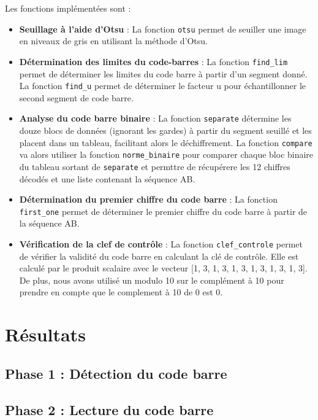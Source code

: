 \documentclass{rapport}
\begin{document}
Les fonctions implémentées sont :
\begin{itemize}
	\item \textbf{Seuillage à l'aide d'Otsu} : La fonction \texttt{otsu} permet de seuiller une image en niveaux de gris en utilisant la méthode d'Otsu.
	\item \textbf{Détermination des limites du code-barres} : La fonction \texttt{find\_lim} permet de déterminer les limites du code barre à partir d'un segment donné. 
	La fonction \texttt{find\_u} permet de déterminer le facteur u pour échantillonner le second segment de code barre.
	\item \textbf{Analyse du code barre binaire} : La fonction \texttt{separate} détermine les douze blocs de données (ignorant les gardes) à partir du segment seuillé et les placent dans un tableau, facilitant alors le déchiffrement. 
	La fonction \texttt{compare} va alors utiliser la fonction \texttt{norme\_binaire} pour comparer chaque bloc binaire du tableau sortant de \texttt{separate} et permttre de récupérere les 12 chiffres décodés et une liste contenant la séquence AB.
	\item \textbf{Détermination du premier chiffre du code barre} : La fonction \texttt{first\_one} permet de déterminer le premier chiffre du code barre à partir de la séquence AB.
	\item \textbf{Vérification de la clef de contrôle} : La fonction \texttt{clef\_controle} permet de vérifier la validité du code barre en calculant la clé de contrôle.
	Elle est calculé par le produit scalaire avec le vecteur [1, 3, 1, 3, 1, 3, 1, 3, 1, 3, 1, 3]. De plus, nous avons utilisé un modulo 10 sur le complément à 10 pour prendre en compte que le complement à 10 de 0 est 0.
\end{itemize}

\section{Résultats}

\subsection{Phase 1 : Détection du code barre}

\subsection{Phase 2 : Lecture du code barre}
\end{document}
